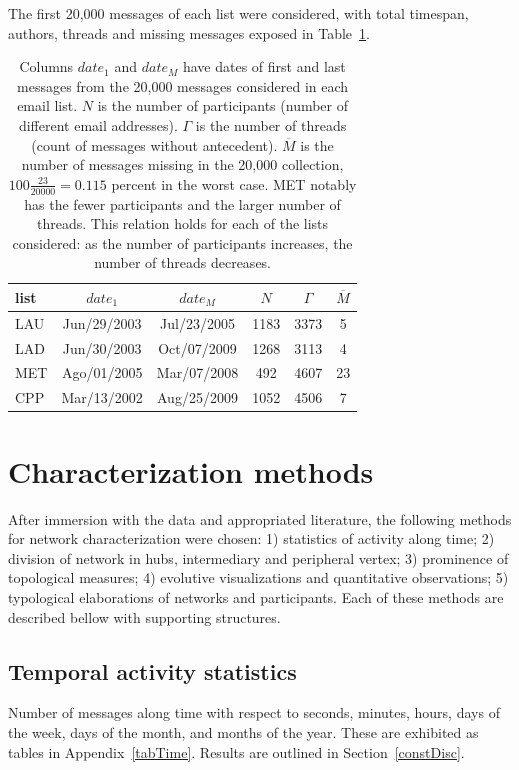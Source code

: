 \documentclass[%
 aip,
 jmp,%
 amsmath,amssymb,
 reprint,%
]{revtex4-1}
\begin{document}
 The first 20,000 messages of each list were considered, with total timespan, authors, threads and missing messages exposed in Table~\ref{geralListas}.

\begin{table}
  \centering
  \caption{Columns $date_1$ and $date_M$ have dates of first and last messages from the 20,000 messages considered in each email list.
$N$ is the number of participants (number of different email addresses).
$\Gamma$ is the number of threads (count of messages without antecedent).
$\overline{M}$ is the number of messages missing in the 20,000 collection, $100\frac{23}{20000}=0.115$ percent in the worst case.
MET notably has the fewer participants and the larger number of threads.
This relation holds for each of the lists considered: as the number of participants increases,
 the number of threads decreases.}
  \label{geralListas}
  \begin{tabular}{|l|c|c|c|c|c|}\hline
list & $date_1$ & $date_{M}$    & $N$  & $\Gamma$ & $\overline{M}$ \\\hline
LAU  & Jun/29/2003 & Jul/23/2005 & 1183 & 3373 & 5 \\
LAD  & Jun/30/2003 & Oct/07/2009 & 1268 & 3113 & 4 \\
MET  & Ago/01/2005 & Mar/07/2008 & 492  & 4607 & 23 \\
CPP  & Mar/13/2002 & Aug/25/2009 & 1052 & 4506 & 7 \\ \hline
  \end{tabular}
\end{table}



\section{Characterization methods}
After immersion with the data and appropriated literature, the following methods for network characterization were chosen: 1) statistics of activity along time; 2) division of network in hubs, intermediary and peripheral vertex; 3) prominence of topological measures; 4) evolutive visualizations and quantitative observations; 5) typological elaborations of networks and participants.
Each of these methods are described bellow with supporting structures.

    \subsection{Temporal activity statistics}
Number of messages along time with respect to seconds, minutes, hours, days of the week, days of the month, and months of the year. These are exhibited as tables in Appendix~\ref{tabTime}. Results are outlined in Section~\ref{constDisc}.
\end{document}
